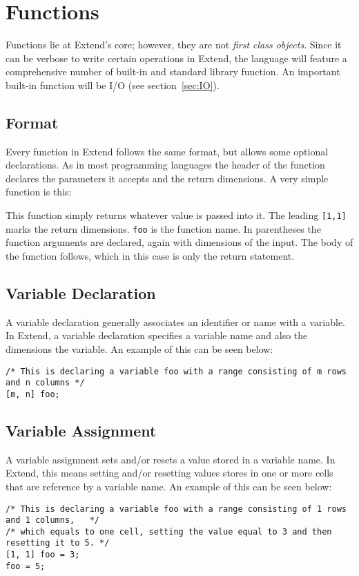 \section{Functions}
Functions lie at Extend's core; however, they are not \textit{first class objects}. Since it can be verbose to write certain operations in Extend, the language will feature a comprehensive number of built-in and standard library function. An important built-in function will be I/O (see section~\ref{sec:IO}).
\subsection{Format}
Every function in Extend follows the same format, but allows some optional declarations. As in most programming languages the header of the function declares the parameters it accepts and the return dimensions. A very simple function is this:

This function simply returns whatever value is passed into it. The leading \texttt{[1,1]} marks the return dimensions. \texttt{foo} is the function name. In parentheses the function arguments are declared, again with dimensions of the input. The body of the function follows, which in this case is only the return statement.
\subsection{Variable Declaration}
A variable declaration generally associates an identifier or name with a variable. In Extend, a variable declaration specifies a variable name and also the dimensions the variable. An example of this can be seen below:
\begin{lstlisting}
/* This is declaring a variable foo with a range consisting of m rows and n columns */
[m, n] foo;
\end{lstlisting}
\subsection{Variable Assignment}
A variable assignment sets and/or resets a value stored in a variable name. In Extend, this means setting and/or resetting values stores in one or more cells that are reference by a variable name. An example of this can be seen below:
\begin{lstlisting}
/* This is declaring a variable foo with a range consisting of 1 rows and 1 columns,   */
/* which equals to one cell, setting the value equal to 3 and then resetting it to 5. */
[1, 1] foo = 3;
foo = 5;
\end{lstlisting}

